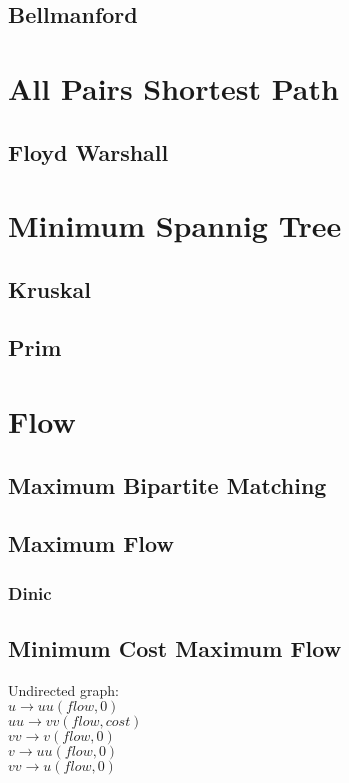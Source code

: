 \documentclass[10pt,a4paper]{report}
\begin{document}
		\subsection{Bellmanford}
			
		
	\section{All Pairs Shortest Path}
		\subsection{Floyd Warshall}
		
	\section{Minimum Spannig Tree}
		\subsection{Kruskal}
		\subsection{Prim}
	
	\newpage
	\section{Flow}
		\subsection{Maximum Bipartite Matching}
			
		\newpage
		\subsection{Maximum Flow}
			\subsubsection{Dinic}
				
		\newpage
		\subsection{Minimum Cost Maximum Flow}
			Undirected graph:\\
			$u \rightarrow uu(flow, 0)$\\
			$uu \rightarrow vv(flow, cost)$\\
			$vv \rightarrow v(flow, 0)$\\
			$v \rightarrow uu(flow, 0)$\\
			$vv \rightarrow u(flow, 0)$
\end{document}
